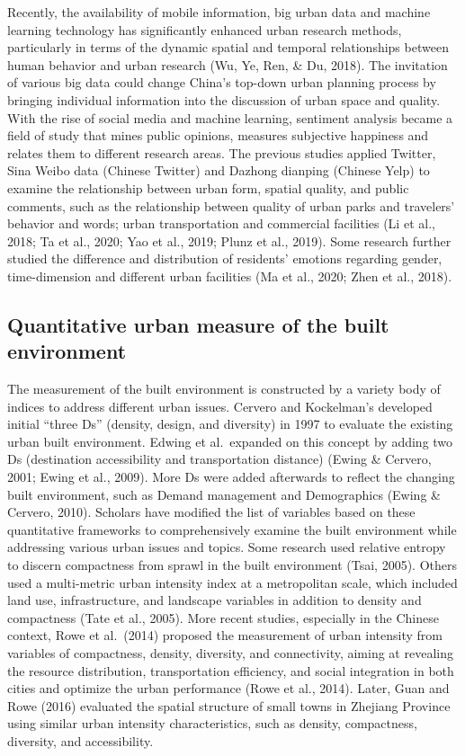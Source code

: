 \documentclass[
]{article}
\begin{document}
Recently, the availability of mobile information, big urban data and
machine learning technology has significantly enhanced urban research
methods, particularly in terms of the dynamic spatial and temporal
relationships between human behavior and urban research (Wu, Ye, Ren, \&
Du, 2018). The invitation of various big data could change China's
top-down urban planning process by bringing individual information into
the discussion of urban space and quality. With the rise of social media
and machine learning, sentiment analysis became a field of study that
mines public opinions, measures subjective happiness and relates them to
different research areas. The previous studies applied Twitter, Sina
Weibo data (Chinese Twitter) and Dazhong dianping (Chinese Yelp) to
examine the relationship between urban form, spatial quality, and public
comments, such as the relationship between quality of urban parks and
travelers' behavior and words; urban transportation and commercial
facilities (Li et al., 2018; Ta et al., 2020; Yao et al., 2019; Plunz et
al., 2019). Some research further studied the difference and
distribution of residents' emotions regarding gender, time-dimension and
different urban facilities (Ma et al., 2020; Zhen et al., 2018).

\hypertarget{quantitative-urban-measure-of-the-built-environment}{%
\subsection{Quantitative urban measure of the built
environment}\label{quantitative-urban-measure-of-the-built-environment}}

The measurement of the built environment is constructed by a variety
body of indices to address different urban issues. Cervero and
Kockelman's developed initial ``three Ds'' (density, design, and
diversity) in 1997 to evaluate the existing urban built environment.
Edwing et al.~expanded on this concept by adding two Ds (destination
accessibility and transportation distance) (Ewing \& Cervero, 2001;
Ewing et al., 2009). More Ds were added afterwards to reflect the
changing built environment, such as Demand management and Demographics
(Ewing \& Cervero, 2010). Scholars have modified the list of variables
based on these quantitative frameworks to comprehensively examine the
built environment while addressing various urban issues and topics. Some
research used relative entropy to discern compactness from sprawl in the
built environment (Tsai, 2005). Others used a multi-metric urban
intensity index at a metropolitan scale, which included land use,
infrastructure, and landscape variables in addition to density and
compactness (Tate et al., 2005). More recent studies, especially in the
Chinese context, Rowe et al.~(2014) proposed the measurement of urban
intensity from variables of compactness, density, diversity, and
connectivity, aiming at revealing the resource distribution,
transportation efficiency, and social integration in both cities and
optimize the urban performance (Rowe et al., 2014). Later, Guan and Rowe
(2016) evaluated the spatial structure of small towns in Zhejiang
Province using similar urban intensity characteristics, such as density,
compactness, diversity, and accessibility.
\end{document}
